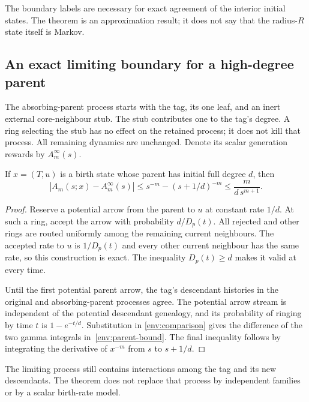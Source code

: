 The boundary labels are necessary for exact agreement of the interior
initial states. The theorem is an approximation result; it does not say
that the radius-$R$ state itself is Markov.

\subsection{An exact limiting boundary for a high-degree parent}

The absorbing-parent process starts with the tag, its one leaf, and an
inert external core-neighbour stub. The stub contributes one to the tag's
degree. A ring selecting the stub has no effect on the retained process;
it does not kill that process. All remaining dynamics are unchanged.
Denote its scalar generation rewards by $A_m^\infty(s)$.

\begin{theorem}\label{env:parent}
If $x=(T,u)$ is a birth state whose parent has initial full degree $d$,
then
\begin{equation}\label{env:parent-bound}
 \boxed{
 |A_m(s;x)-A_m^\infty(s)|
 \le s^{-m}-(s+1/d)^{-m}
 \le\frac{m}{d\,s^{m+1}}.
 }
\end{equation}
\end{theorem}
\begin{proof}
Reserve a potential arrow from the parent to $u$ at constant rate $1/d$.
At such a ring, accept the arrow with probability $d/D_p(t)$.
All rejected and other rings are routed uniformly among the remaining
current neighbours. The accepted rate to $u$ is $1/D_p(t)$ and every
other current neighbour has the same rate, so this construction is exact.
The inequality $D_p(t)\ge d$ makes it valid at every time.

Until the first potential parent arrow, the tag's descendant histories in
the original and absorbing-parent processes agree. The potential arrow
stream is independent of the potential descendant genealogy, and its
probability of ringing by time $t$ is $1-e^{-t/d}$. Substitution in
\eqref{env:comparison} gives the difference of the two gamma integrals
in~\eqref{env:parent-bound}. The final inequality follows by integrating
the derivative of $x^{-m}$ from $s$ to $s+1/d$.
\end{proof}

The limiting process still contains interactions among the tag and its
new descendants. The theorem does not replace that process by independent
families or by a scalar birth-rate model.

